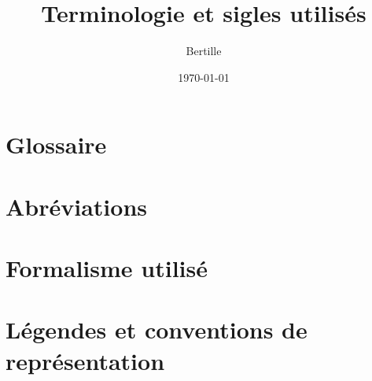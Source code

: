 \documentclass{../res/univ-projet}
\title{Terminologie et sigles utilisés}
\author{Bertille \bsc{Bouillie}}
\date{\today}
\begin{document}
\maketitle
\newpage
\tableofcontents
\newpage


\section{Glossaire}

\begin{description}
 \item 
\end{description}



\section{Abréviations}

\begin{description}
 \item 
\end{description}



\section{Formalisme utilisé}

\begin{description}
 \item 
\end{description}



\section{Légendes et conventions de représentation}

\begin{description}
 \item 
\end{description}
\end{document}
